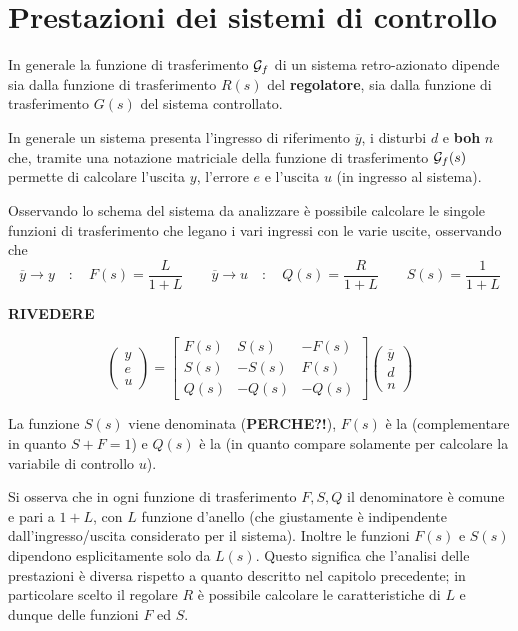 \chapter{Prestazioni dei sistemi di controllo}
	
	In generale la funzione di trasferimento $\mathcal G_f$ di un sistema retro-azionato dipende sia dalla funzione di trasferimento $R(s)$ del \textbf{regolatore}, sia dalla funzione di trasferimento $G(s)$ del sistema controllato.
	
	In generale un sistema presenta l'ingresso di riferimento $\overline y$, i disturbi $d$ e \textbf{boh} $n$ che, tramite una notazione matriciale della funzione di trasferimento $\mathcal G_f(s)$ permette di calcolare l'uscita $y$, l'errore $e$ e l'uscita $u$ (in ingresso al sistema).
	
	Osservando lo schema del sistema da analizzare è possibile calcolare le singole funzioni di trasferimento che legano i vari ingressi con le varie uscite, osservando che
	\[ \overline y \rightarrow y \quad: \quad  F(s) = \frac L {1+L} \qquad \overline y \rightarrow u \quad: \quad Q(s) = \frac R {1+L} \qquad S(s) = \frac 1 {1+L} \]
	
	\textbf{RIVEDERE}
	
	\[ \begin{pmatrix}
		 y\\ e \\ u
	\end{pmatrix} = \begin{bmatrix}
	 	F(s)  & S(s) & -F(s) \\ S(s) & - S(s) & F(s) \\ Q(s) & - Q(s) & - Q(s) 
	\end{bmatrix}  \begin{pmatrix}
		\overline y \\ d \\ n
	\end{pmatrix}\]
	
	La funzione $S(s)$ viene denominata  (\textbf{PERCHE?!}), $F(s)$ è la  (complementare in quanto $S + F = 1$) e $Q(s)$ è la  (in quanto compare solamente per calcolare la variabile di controllo $u$).
	
	Si osserva che in ogni funzione di trasferimento $F,S,Q$ il denominatore è comune e pari a $1 + L$, con $L$ funzione d'anello (che giustamente è indipendente dall'ingresso/uscita considerato per il sistema). Inoltre le funzioni $F(s)$ e $S(s)$ dipendono esplicitamente solo da $L(s)$. Questo significa che l'analisi delle prestazioni è diversa rispetto a quanto descritto nel capitolo precedente; in particolare scelto il regolare $R$ è possibile calcolare le caratteristiche di $L$ e dunque delle funzioni $F$ ed $S$. 
	
